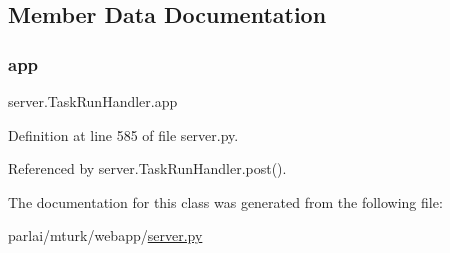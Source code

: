 \subsection{Member Data Documentation}
\mbox{\label{classserver_1_1TaskRunHandler_ab83d3c804b50f8301eefd56eb9be838f}} 
\subsubsection{\texorpdfstring{app}{app}}
{\footnotesize\ttfamily server.\+Task\+Run\+Handler.\+app}



Definition at line 585 of file server.\+py.



Referenced by server.\+Task\+Run\+Handler.\+post().



The documentation for this class was generated from the following file\+:\begin{DoxyCompactItemize}
\item 
parlai/mturk/webapp/\hyperlink{server_8py}{server.\+py}\end{DoxyCompactItemize}
